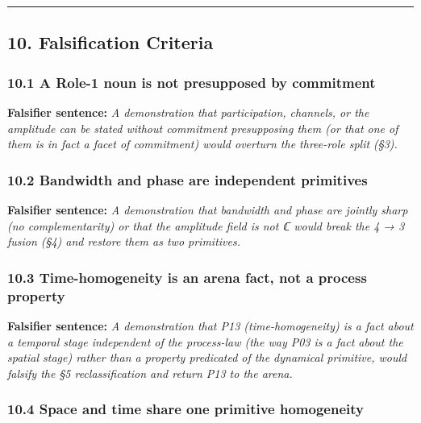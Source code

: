 \documentclass[
  11pt,
]{article}
\begin{document}
\begin{center}\rule{0.5\linewidth}{0.5pt}\end{center}

\subsection{10. Falsification Criteria}\label{falsification-criteria}

\subsubsection{10.1 A Role-1 noun is not presupposed by
commitment}\label{a-role-1-noun-is-not-presupposed-by-commitment}

\textbf{Falsifier sentence:} \emph{A demonstration that participation,
channels, or the amplitude can be stated without commitment presupposing
them (or that one of them is in fact a facet of commitment) would
overturn the three-role split (§3).}

\subsubsection{10.2 Bandwidth and phase are independent
primitives}\label{bandwidth-and-phase-are-independent-primitives}

\textbf{Falsifier sentence:} \emph{A demonstration that bandwidth and
phase are jointly sharp (no complementarity) or that the amplitude field
is not ℂ would break the 4 → 3 fusion (§4) and restore them as two
primitives.}

\subsubsection{10.3 Time-homogeneity is an arena fact, not a process
property}\label{time-homogeneity-is-an-arena-fact-not-a-process-property}

\textbf{Falsifier sentence:} \emph{A demonstration that P13
(time-homogeneity) is a fact about a temporal stage independent of the
process-law (the way P03 is a fact about the spatial stage) rather than
a property predicated of the dynamical primitive, would falsify the §5
reclassification and return P13 to the arena.}

\subsubsection{10.4 Space and time share one primitive
homogeneity}\label{space-and-time-share-one-primitive-homogeneity}
\end{document}
